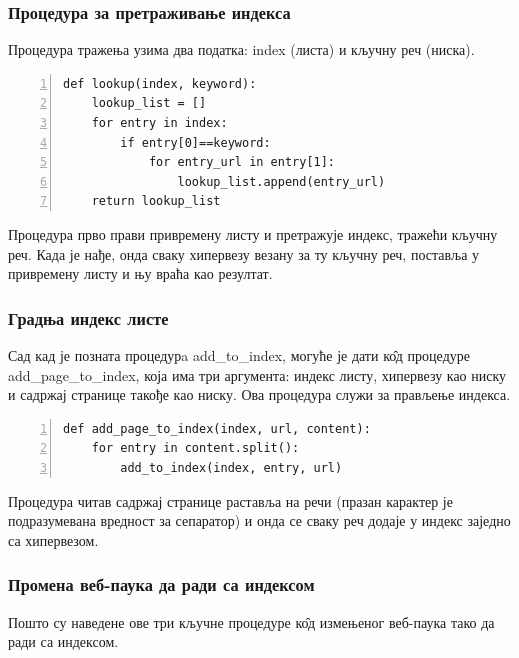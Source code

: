 \subsubsection{Процедура за претраживање индекса}

Процедура тражења узима два податка: index (листа) и кључну реч (ниска).

\begin{lstlisting}[caption=Процедура lookup, label={lst:lookup}, numbers=left]
def lookup(index, keyword):
    lookup_list = []
    for entry in index:
        if entry[0]==keyword:
            for entry_url in entry[1]:
                lookup_list.append(entry_url)
    return lookup_list
		\end{lstlisting}

Процедура прво прави привремену листу и претражује индекс, тражећи кључну реч. Када је нађе, онда сваку хипервезу везану за ту кључну реч, поставља у привремену листу и њу враћа као резултат.


\subsubsection{Градња индекс листе}

Сад кад је позната процедурa add\_to\_index, могуће је дати к\^{о}д процедуре add\_page\_to\_index, која има три аргумента: индекс листу, хипервезу као ниску и садржај странице такође као ниску. Ова процедура служи за прављење индекса.

\begin{lstlisting}[caption=Процедура add\_page\_to\_index , label={lst:addpagetoindex}, numbers=left]
def add_page_to_index(index, url, content):
    for entry in content.split():
        add_to_index(index, entry, url)
		\end{lstlisting}

Процедура читав садржај странице раставља на речи (празан карактер је подразумевана вредност за сепаратор) и онда се сваку реч додаје у индекс заједно са хипервезом.

\subsubsection{Промена веб-паука да ради са индексом}
Пошто су наведене ове три кључне процедуре к\^{о}д измењеног веб-паука тако да ради са индексом.

